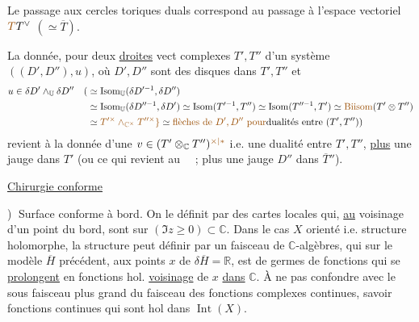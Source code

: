 



Le passage aux cercles toriques  duals correspond au passage
à l'espace vectoriel 
 $\deleted{\unsure{T}}T^{\vee}$ $(\simeq\overline T)$.

La donnée, pour deux \uline{droites} vect complexes $T',T''$
d'un système $((D',D''),u)$, où $D',D''$ sont des
disques dans $T',T''$ et
\[
\begin{aligned}
u\in\delta D'\wedge_{\mathbb U}\delta D''\quad
(&\simeq\operatorname{Isom}_{\mathbb U}(\delta D'^{-1},\delta D'')\\
&\simeq\operatorname{Isom}_{\mathbb U}(\delta D''^{-1},\delta D')
\simeq\operatorname{Isom}(T'^{-1},T'')
\simeq\operatorname{Isom}(T''^{-1},T')
\simeq\unsure{\operatorname{Biisom}}(T'\otimes T'')\\
&\simeq\unsure{T'^{\times}\wedge_{\mathbb C^{\times}}T''^{\times}}
\unsure{\}}\simeq\deleted{\unsure{\text{flèches de }D',D''\ \text{pour}}}
\text{dualités entre }(T',T''))
\end{aligned}
\]
revient à la donnée d'une $v\in(T'\otimes_{\mathbb C}T'')^{\unsure{\times|*}}$
i.e. une dualité entre $T',T''$, \uline{plus} une jauge  dans $T'$
(ou ce qui revient au \ \ ; plus une jauge
$D''$ dans $\overline T''$).

\uline{}

\uline{Chirurgie conforme}

\textcircled{)} Surface conforme à bord. On  le définit par des
cartes locales qui, \uline{au} voisinage d'un point du
bord, sont  sur  $(\Im z\geq0)\subset\mathbb C$.
Dans le cas $X$ orienté i.e. structure holomorphe, la
structure peut  définir par un faisceau
de $\mathbb C$-algèbres, qui sur le modèle
$\overline H$ précédent, aux points $x$ de $\delta\overline H=\mathbb R$, est 
de germes de fonctions qui se \uline{prolongent} en
fonctions hol.  \uline{voisinage} de $x$ \uline{dans} $\mathbb C$.
À ne pas confondre avec le sous faisceau
plus grand du faisceau des fonctions
complexes continues, savoir  fonctions
continues qui sont hol dans $\operatorname{Int}(X)$.

